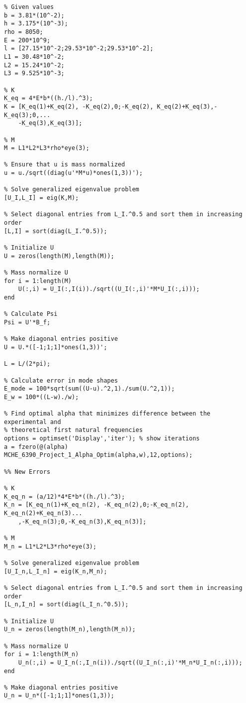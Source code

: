 \documentclass{article}
\begin{document}
\begin{lstlisting}[style=Matlab-editor]
%% Initial Errors
% Given values
b = 3.81*(10^-2);
h = 3.175*(10^-3);
rho = 8050;
E = 200*10^9;
l = [27.15*10^-2;29.53*10^-2;29.53*10^-2];
L1 = 30.48*10^-2;
L2 = 15.24*10^-2;
L3 = 9.525*10^-3;

% K
K_eq = 4*E*b*((h./l).^3);
K = [K_eq(1)+K_eq(2), -K_eq(2),0;-K_eq(2), K_eq(2)+K_eq(3),-K_eq(3);0,...
    -K_eq(3),K_eq(3)];
      
% M
M = L1*L2*L3*rho*eye(3);

% Ensure that u is mass normalized
u = u./sqrt((diag(u'*M*u)*ones(1,3))');

% Solve generalized eigenvalue problem
[U_I,L_I] = eig(K,M);

% Select diagonal entries from L_I.^0.5 and sort them in increasing order
[L,I] = sort(diag(L_I.^0.5));

% Initialize U
U = zeros(length(M),length(M));

% Mass normalize U
for i = 1:length(M)
    U(:,i) = U_I(:,I(i))./sqrt((U_I(:,i)'*M*U_I(:,i)));
end

% Calculate Psi
Psi = U'*B_f;

% Make diagonal entries positive
U = U.*([-1;1;1]*ones(1,3))';

L = L/(2*pi);

% Calculate error in mode shapes
E_mode = 100*sqrt(sum((U-u).^2,1)./sum(U.^2,1));
E_w = 100*((L-w)./w);

% Find optimal alpha that minimizes difference between the experimental and
% theoretical first natural frequencies
options = optimset('Display','iter'); % show iterations
a = fzero(@(alpha) MCHE_6390_Project_1_Alpha_Optim(alpha,w),12,options);

%% New Errors

% K
K_eq_n = (a/12)*4*E*b*((h./l).^3);
K_n = [K_eq_n(1)+K_eq_n(2), -K_eq_n(2),0;-K_eq_n(2), K_eq_n(2)+K_eq_n(3)...
    ,-K_eq_n(3);0,-K_eq_n(3),K_eq_n(3)];
      
% M
M_n = L1*L2*L3*rho*eye(3);

% Solve generalized eigenvalue problem
[U_I_n,L_I_n] = eig(K_n,M_n);

% Select diagonal entries from L_I.^0.5 and sort them in increasing order
[L_n,I_n] = sort(diag(L_I_n.^0.5));

% Initialize U
U_n = zeros(length(M_n),length(M_n));

% Mass normalize U
for i = 1:length(M_n)
    U_n(:,i) = U_I_n(:,I_n(i))./sqrt((U_I_n(:,i)'*M_n*U_I_n(:,i)));
end

% Make diagonal entries positive
U_n = U_n*([-1;1;1]*ones(1,3));


\end{lstlisting}
\end{document}
